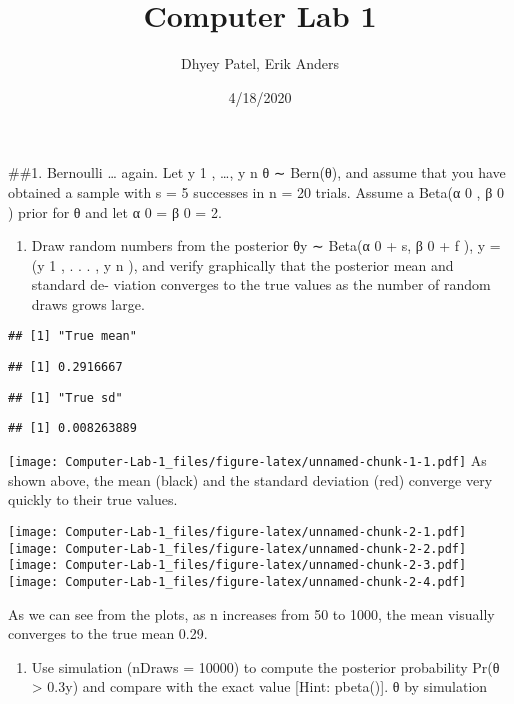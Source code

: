 \documentclass[]{article}
\title{Computer Lab 1}
\author{Dhyey Patel, Erik Anders}
\date{4/18/2020}
\providecommand{\tightlist}{%
  \setlength{\itemsep}{0pt}\setlength{\parskip}{0pt}}
\begin{document}
\maketitle

\#\#1. Bernoulli \ldots{} again. Let y 1 , \ldots{}, y n \textbar{}θ ∼
Bern(θ), and assume that you have obtained a sample with s = 5 successes
in n = 20 trials. Assume a Beta(α 0 , β 0 ) prior for θ and let α 0 = β
0 = 2.

\begin{enumerate}
\def\labelenumi{(\alph{enumi})}
\tightlist
\item
  Draw random numbers from the posterior θ\textbar{}y ∼ Beta(α 0 + s, β
  0 + f ), y = (y 1 , . . . , y n ), and verify graphically that the
  posterior mean and standard de- viation converges to the true values
  as the number of random draws grows large.
\end{enumerate}

\begin{verbatim}
## [1] "True mean"
\end{verbatim}

\begin{verbatim}
## [1] 0.2916667
\end{verbatim}

\begin{verbatim}
## [1] "True sd"
\end{verbatim}

\begin{verbatim}
## [1] 0.008263889
\end{verbatim}

\texttt{[image: Computer-Lab-1\_files/figure-latex/unnamed-chunk-1-1.pdf]}
As shown above, the mean (black) and the standard deviation (red)
converge very quickly to their true values.

\texttt{[image: Computer-Lab-1\_files/figure-latex/unnamed-chunk-2-1.pdf]}
\texttt{[image: Computer-Lab-1\_files/figure-latex/unnamed-chunk-2-2.pdf]}
\texttt{[image: Computer-Lab-1\_files/figure-latex/unnamed-chunk-2-3.pdf]}
\texttt{[image: Computer-Lab-1\_files/figure-latex/unnamed-chunk-2-4.pdf]}

As we can see from the plots, as n increases from 50 to 1000, the mean
visually converges to the true mean 0.29.

\begin{enumerate}
\def\labelenumi{(\alph{enumi})}
\setcounter{enumi}{1}
\tightlist
\item
  Use simulation (nDraws = 10000) to compute the posterior probability
  Pr(θ \textgreater{} 0.3\textbar{}y) and compare with the exact value
  {[}Hint: pbeta(){]}. θ by simulation
\end{enumerate}
\end{document}
